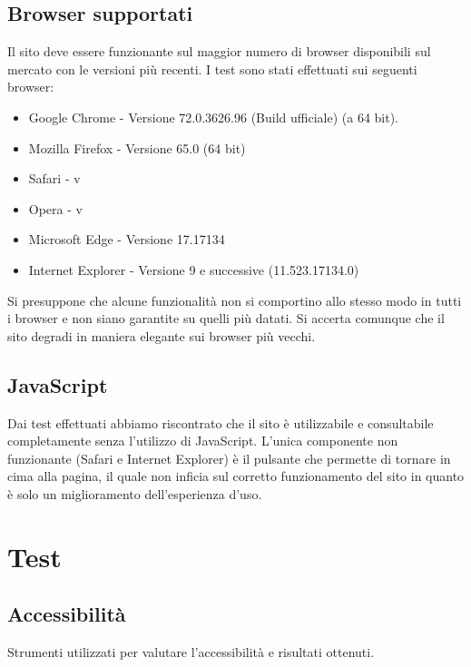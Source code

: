 \documentclass[12pt]{article}
\begin{document}
	\subsection{Browser supportati}
	Il sito deve essere funzionante sul maggior numero di browser disponibili sul mercato con le versioni più recenti. I test sono stati effettuati sui seguenti browser:
		\begin{itemize}
			\item Google Chrome - Versione 72.0.3626.96 (Build ufficiale) (a 64 bit).
			\item Mozilla Firefox - Versione 65.0 (64 bit)
			\item Safari - v
			\item Opera - v
			\item Microsoft Edge - Versione 17.17134
			\item Internet Explorer - Versione 9 e successive (11.523.17134.0)
		\end{itemize}
	Si presuppone che alcune funzionalità non si comportino allo stesso modo in tutti i browser e non siano garantite su quelli più datati. Si accerta comunque che il sito degradi in	maniera elegante sui browser più vecchi.
	\subsection{JavaScript}
	Dai test effettuati abbiamo riscontrato che il sito è utilizzabile e consultabile completamente senza l'utilizzo di JavaScript. L'unica componente non funzionante (Safari e Internet Explorer) è il pulsante che permette di tornare in cima alla pagina, il quale non inficia sul corretto funzionamento del sito in quanto è solo un miglioramento dell'esperienza d'uso.
	
	\section{Test}
	\subsection{Accessibilità}
	Strumenti utilizzati per valutare l'accessibilità e risultati ottenuti.
\end{document}
